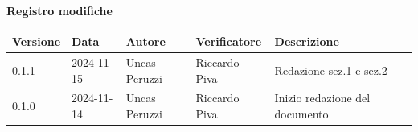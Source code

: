 \documentclass[11pt]{article}
\begin{document}
\centering\textbf{Registro modifiche}\\
\vspace{2mm}
\begin{tabular}{|l|l|l|l|l|l|}
\hline
\textbf{Versione} & \textbf{Data} & \textbf{Autore} & \textbf{Verificatore} & \textbf{Descrizione} \\
\hline
0.1.1 & 2024-11-15 & Uncas Peruzzi  & Riccardo Piva & Redazione sez.1 e sez.2 \\
\hline
0.1.0 & 2024-11-14 & Uncas Peruzzi  & Riccardo Piva & Inizio redazione del documento\\
\hline
\end{tabular}
\newpage
\tableofcontents
\listoffigures %
\end{document}
